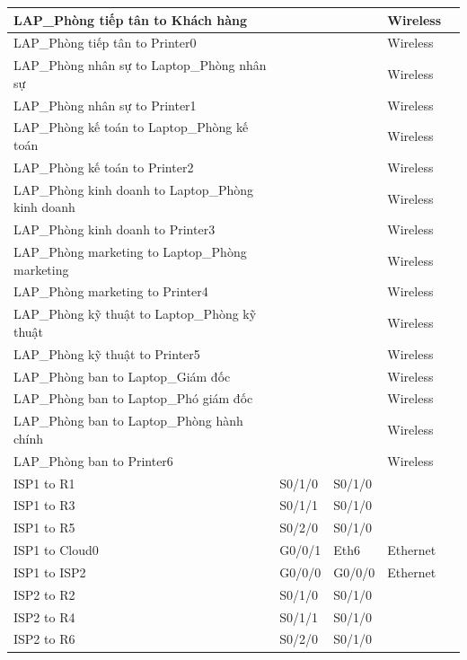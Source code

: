 \documentclass[12pt,a4paper]{report}
\begin{document}
\begin{center}
\begin{longtable}{|p{}|p{}|p{}|p{}|p{}|}
\hline  LAP\_Phòng tiếp tân  to  Khách hàng  &    &    &  Wireless  &   \\
\hline  LAP\_Phòng tiếp tân  to  Printer0  &    &    &  Wireless  &   \\
\hline  LAP\_Phòng nhân sự  to  Laptop\_Phòng nhân sự  &    &    &  Wireless  &   \\
\hline  LAP\_Phòng nhân sự  to  Printer1  &    &    &  Wireless  &   \\
\hline  LAP\_Phòng kế toán  to  Laptop\_Phòng kế toán  &    &    &  Wireless  &   \\
\hline  LAP\_Phòng kế toán  to  Printer2  &    &    &  Wireless  &   \\
\hline  LAP\_Phòng kinh doanh  to  Laptop\_Phòng kinh doanh  &    &    &  Wireless  &   \\
\hline  LAP\_Phòng kinh doanh  to  Printer3  &    &    &  Wireless  &   \\
\hline  LAP\_Phòng marketing  to  Laptop\_Phòng marketing  &    &    &  Wireless  &   \\
\hline  LAP\_Phòng marketing  to  Printer4  &    &    &  Wireless  &   \\
\hline  LAP\_Phòng kỹ thuật  to  Laptop\_Phòng kỹ thuật  &    &    &  Wireless  &   \\
\hline  LAP\_Phòng kỹ thuật  to  Printer5  &    &    &  Wireless  &   \\
\hline  LAP\_Phòng ban  to  Laptop\_Giám đốc  &    &    &  Wireless  &   \\
\hline  LAP\_Phòng ban  to  Laptop\_Phó giám đốc  &    &    &  Wireless  &   \\
\hline  LAP\_Phòng ban  to  Laptop\_Phòng hành chính  &    &    &  Wireless  &   \\
\hline  LAP\_Phòng ban  to  Printer6  &    &    &  Wireless  &   \\
\hline  ISP1  to  R1  &  S0/1/0  &  S0/1/0  &    &   \\
\hline  ISP1  to  R3  &  S0/1/1  &  S0/1/0  &    &   \\
\hline  ISP1  to  R5  &  S0/2/0  &  S0/1/0  &    &   \\
\hline  ISP1  to  Cloud0  &  G0/0/1  &  Eth6  &  Ethernet  &   \\
\hline  ISP1  to  ISP2  &  G0/0/0  &  G0/0/0  &  Ethernet  &   \\
\hline  ISP2  to  R2  &  S0/1/0  &  S0/1/0  &    &   \\
\hline  ISP2  to  R4  &  S0/1/1  &  S0/1/0  &    &   \\
\hline  ISP2  to  R6  &  S0/2/0  &  S0/1/0  &    &   \\

\end{longtable}
\end{center}
\end{document}
